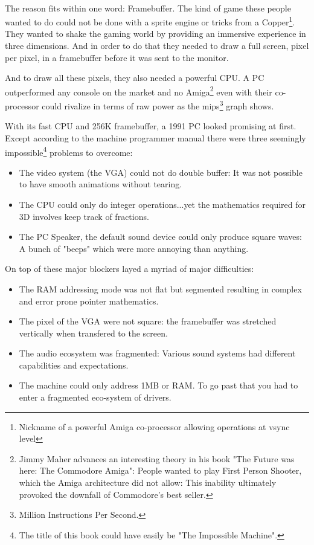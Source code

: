 \\
The reason fits within one word: Framebuffer. The kind of game these people wanted to do could not be done with a sprite engine or tricks from a Copper\footnote{Nickname of a powerful Amiga co-processor allowing operations at vsync level}. They wanted to shake the gaming world by providing an immersive experience in three dimensions. And in order to do that they needed to draw a full screen, pixel per pixel, in a framebuffer before it was sent to the monitor. \\
\par
And to draw all these pixels, they also needed a powerful CPU. A PC outperformed any console on the market and no Amiga\footnote{Jimmy Maher advances an interesting theory in his book "The Future was here: The Commodore Amiga": People wanted to play First Person Shooter, which the Amiga architecture did not allow: This inability ultimately provoked the downfall of Commodore's best seller.} even with their co-processor could rivalize in terms of raw power as the mips\footnote{Million Instructions Per Second.} graph shows.
\par


 
With its fast CPU and 256K framebuffer, a 1991 PC looked promising at first. Except according to the machine programmer manual there were three seemingly impossible\footnote{The title of this book could have easily be "The Impossible Machine".} problems to overcome:\\
\begin{itemize}
\item The video system (the VGA) could not do double buffer: It was not possible to have smooth animations without tearing.
\item The CPU could only do integer operations...yet the mathematics required for 3D involves keep track of fractions.
\item The PC Speaker, the default sound device could only produce square waves: A bunch of "beeps" which were more annoying than anything.
\end{itemize}
On top of these major blockers layed a myriad of major difficulties:\\
\begin{itemize}
\item The RAM addressing mode was not flat but segmented resulting in complex and error prone pointer mathematics.
\item The pixel of the VGA were not square: the framebuffer was stretched vertically when transfered to the screen.
\item The audio ecosystem was fragmented: Various sound systems had different capabilities and expectations.
\item The machine could only address 1MB or RAM. To go past that you had to enter a fragmented eco-system of drivers.
\end{itemize}

